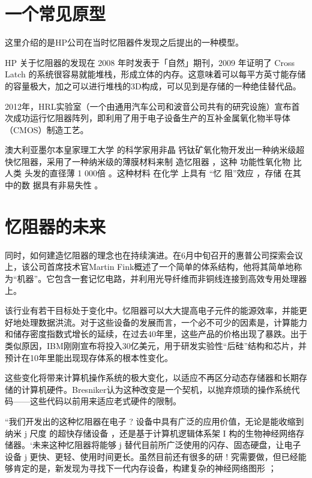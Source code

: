 \documentclass[UTF8]{article}
\begin{document}
\section{一个常见原型}
这里介绍的是HP公司在当时忆阻器件发现之后提出的一种模型。



HP 关于忆阻器的发现在 2008 年时发表于「自然」期刊，2009 年证明了 Cross Latch 的系统很容易就能堆栈，形成立体的内存。这意味着可以每平方英寸能存储的容量极大，加之可以进行堆栈的3D构成，可以见到是存储的一种绝佳替代品。

2012年，HRL实验室（一个由通用汽车公司和波音公司共有的研究设施）宣布首次成功运行忆阻器阵列，即利用了用于电子设备生产的互补金属氧化物半导体（CMOS）制造工艺。

澳大利亚墨尔本皇家理工大学 的科学家用非晶 钙钛矿氧化物开发出一种纳米级超快忆阻器，采用了一种纳米级的薄膜材料来制 造忆阻器 ，这种 功能性氧化物 比人类 头发的直径薄 1 000倍 。这种材料 在化学 上具有 “忆 阻”效应 ，存储 在其 中的数 据具有非易失性 。 



\section{忆阻器的未来}
 同时，如何建造忆阻器的理念也在持续演进。在6月中旬召开的惠普公司探索会议上，该公司首席技术官Martin Fink概述了一个简单的体系结构，他将其简单地称为“机器”。它包含一套记忆电路，并利用光导纤维而非铜线连接到高效专用处理器上。

该行业有若干目标处于变化中。忆阻器可以大大提高电子元件的能源效率，并能更好地处理数据洪流。对于这些设备的发展而言，一个必不可少的因素是，计算能力和储存密度指数式增长的延续，在过去40年里，这些产品的价格出现了暴跌。出于类似原因，IBM刚刚宣布将投入30亿美元，用于研发实验性“后硅”结构和芯片，并预计在10年里能出现现存体系的根本性变化。

这些变化将带来计算机操作系统的极大变化，以适应不再区分动态存储器和长期存储的计算机硬件。Bresniker认为这种改变是一个契机，以抛弃烦琐的操作系统代码——这些代码以前用来适应老式硬件的限制。

“我们开发出的这种忆阻器在电子 ? 设备中具有广泛的应用价值，无论是能收缩到纳米 j 尺度 的超快存储设备 ，还是基于计算机逻辑体系架 I 构的生物神经网络存储器。‘未来这种忆阻器将能够 j 替代目前所广泛使用的闪存、固态硬盘，让电子设备 j 更快、更轻、使用时间更长。虽然目前还有很多的研 ! 究需要做，但已经能够肯定的是，新发现为寻找下一代内存设备，构建复杂的神经网络图形 ； 
\end{document}
